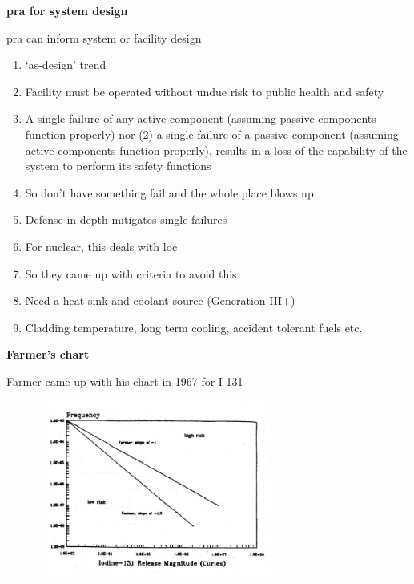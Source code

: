 \documentclass[aspectratio=1610,pdftex,dvipsnames,compress,xcolor={dvipsnames}]{beamer}
\newcommand{\acs}{\acrshort} %
\begin{document}
\begin{frame}[plain]{}
    \centering\LARGE\textbf{\acs{pra} for system design}
\end{frame}


\addtocounter{framenumber}{-1}
\begin{frame}{\acs{pra} can inform system or facility design}
    \begin{enumerate}[series=outerlist,topsep=0pt,itemsep=7pt,leftmargin=*,label=(\arabic*)]
        \item[]`as-design' trend
        \item[]Facility must be operated without undue risk to public health and safety
        \item[]A single failure of any active component (assuming passive components function properly) nor (2) a single failure of a passive component (assuming active components function properly), results in a loss of the capability of the system to perform its safety functions
        \item[]So don't have something fail and the whole place blows up
        \item[]Defense-in-depth mitigates single failures
        \item[]For nuclear, this deals with \acs{loc}
        \item[]So they came up with criteria to avoid this
        \item[]Need a heat sink and coolant source (Generation III+)  
        \item[]Cladding temperature, long term cooling, accident tolerant fuels etc.
    \end{enumerate}
\end{frame}


\begin{frame}[plain]{}
    \centering\LARGE\textbf{Farmer's chart}
\end{frame}


\addtocounter{framenumber}{-1}
\begin{frame}{Farmer came up with his chart in 1967 for I-131}
    \begin{figure}
        \centering
        \includegraphics[width=0.75\textwidth]{farmers.chart.jpg}
    \end{figure}
\end{frame}
\end{document}
